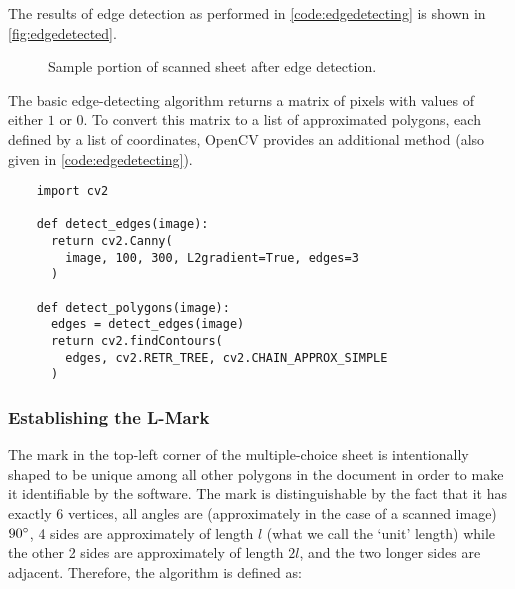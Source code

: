 \documentclass[12pt, letterpaper]{report}
\newcommand*{\itemref}[1]{\hypersetup{linkcolor=usfgreen}\hyperref[{#1}]{\autoref*{#1}}}
\newcommand*{\boxedimage}[1]{\fbox{\texttt{[image: img/\#1]}}}
\newcommand{\fig}[3]{
  \begin{figure}[h]
    \caption{#1}
    \label{#3}
    \centering
    \boxedimage{#2}
  \end{figure}
}
\begin{document}
The results of edge detection as performed in \itemref{code:edgedetecting} is
shown in \itemref{fig:edgedetected}.

\fig{Sample portion of scanned sheet after edge detection.}{sample/edges.jpg}{fig:edgedetected}

The basic edge-detecting algorithm returns
a matrix of pixels with values of either $1$ or $0$. To convert this matrix to
a list of approximated polygons, each defined by a list of coordinates,
OpenCV provides an additional method (also given in \itemref{code:edgedetecting}).

\begin{codesample}[h]
  \caption{Canny edge-detection and polygon establishment performed on an input image.}
  \label{code:edgedetecting}
  \begin{verbatim}
    import cv2

    def detect_edges(image):
      return cv2.Canny(
        image, 100, 300, L2gradient=True, edges=3
      )

    def detect_polygons(image):
      edges = detect_edges(image)
      return cv2.findContours(
        edges, cv2.RETR_TREE, cv2.CHAIN_APPROX_SIMPLE
      )
  \end{verbatim}
\end{codesample}

\subsubsection{Establishing the \textbf{L}-Mark}
The mark in the top-left corner of the multiple-choice sheet is intentionally
shaped to be unique among all other polygons in the document in order to make it
identifiable by the software. The mark is distinguishable by the fact that it
has exactly 6 vertices, all angles are (approximately in the case of a scanned
image) $90\degree$, 4 sides are approximately of length $l$ (what we call
the `unit' length) while the other 2 sides are approximately of length $2l$,
and the two longer sides are adjacent. Therefore, the algorithm is defined as:
\end{document}
